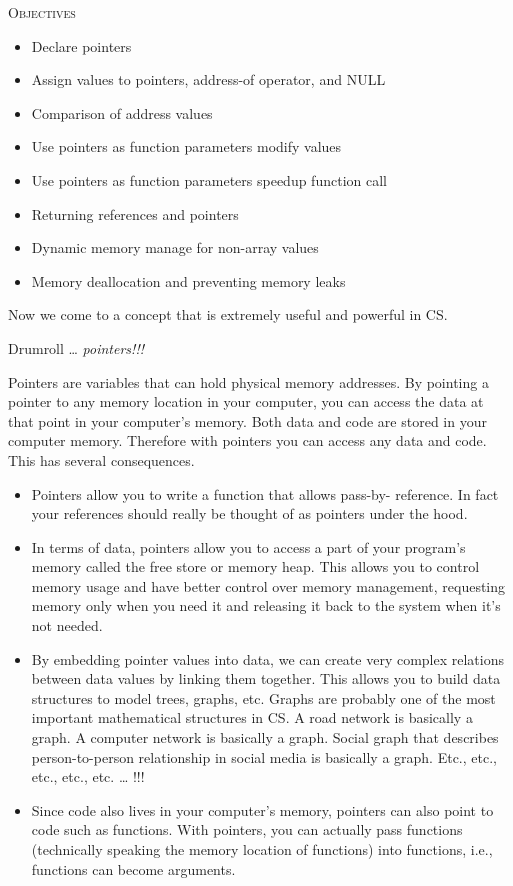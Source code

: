 \newpage{}

\textsc{Objectives}

\begin{itemize}

\item
  Declare pointers
\item
  Assign values to pointers, address-of operator, and NULL
\item
  Comparison of address values
\item
  Use pointers as function parameters modify values
\item
  Use pointers as function parameters speedup function call
\item
  Returning references and pointers
\item
  Dynamic memory manage for non-array values
\item
  Memory deallocation and preventing memory leaks
\end{itemize}

Now we come to a concept that is extremely useful and powerful in CS.

Drumroll \ldots{} \emph{pointers!!!}

Pointers are variables that can hold physical memory addresses. By pointing a pointer to any memory location in your computer, you can access the data at that point in your computer's memory. Both data and code are stored in your computer memory. Therefore with pointers you can access any data and code. This has several consequences.

\begin{itemize}
\item
  Pointers allow you to write a function that allows pass-by- reference.
  In fact your references should really be thought of as pointers under
  the hood.
\item
  In terms of data, pointers allow you to access a part of your
  program's memory called the free store or memory heap. This allows you
  to control memory usage and have better control over memory
  management, requesting memory only when you need it and releasing it
  back to the system when it's not needed.
\item
  By embedding pointer values into data, we can create very complex
  relations between data values by linking them together. This allows
  you to build data structures to model trees, graphs, etc. Graphs are
  probably one of the most important mathematical structures in CS. A
  road network is basically a graph. A computer network is basically a
  graph. Social graph that describes person-to-person relationship in
  social media is basically a graph. Etc., etc., etc., etc., etc.
  \ldots{} !!!
\item
  Since code also lives in your computer's memory, pointers can also
  point to code such as functions. With pointers, you can actually pass
  functions (technically speaking the memory location of functions) into
  functions, i.e., functions can become arguments.
\end{itemize}

